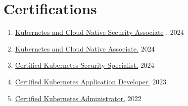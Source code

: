 \documentclass[11pt]{article}
\newcommand{\rside}[1]{
  \hfill {\normalfont\color{accent} #1}%
}
\begin{document}
\section{Certifications}
\begin{enumerate}[label=\null, left=0pt..0pt, itemsep=0pt]
  \item \href{https://www.credly.com/badges/871d71ae-5ad4-4610-a92c-c93145b30d53/public_url}{Kubernetes and Cloud Native Security Associate} . \rside{2024}
  \item \href{https://www.credly.com/badges/0560ea75-b3e7-4bc1-b077-66abd00622b5/public_url}{Kubernetes and Cloud Native Associate.} \rside{2024}
  \item \href{https://www.credly.com/badges/2ff816db-c2e5-4c2c-b87b-2eaaca2e089e/public_url}{Certified Kubernetes Security Specialist.} \rside{2024}
  \item \href{https://www.credly.com/badges/6d2e8ee2-57a0-45eb-99a8-b7875562dc25/public_url}{Certified Kubernetes Application Developer.} \rside{2023}
  \item \href{https://www.credly.com/badges/c0ff3fcc-9513-4fab-ac8a-95061a53f343/public_url}{Certified Kubernetes Administrator.} \rside{2022}
\end{enumerate}




\end{document}
